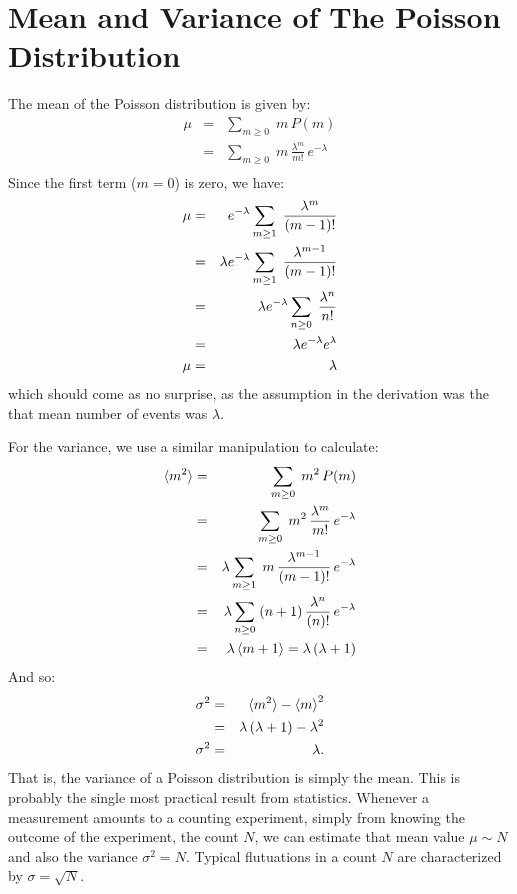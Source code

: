 \documentclass[12pt,oneside]{book}
\begin{document}
\section{Mean and Variance of The Poisson Distribution}
\label{sec:poissonmeanvar}

The mean of the Poisson distribution is given by:
\begin{eqnarray*}
\mu &=& \sum_{m \geq 0} \; m \, P(m) \\
&=& \sum_{m \geq 0} \; m \, \frac{\lambda^m}{m!} \, e^{-\lambda}\\
\end{eqnarray*}
Since the first term ($m=0$) is zero, we have:
\begin{eqnarray}
\mu &=& e^{-\lambda} \sum_{m \geq 1} \; \frac{\lambda^m}{(m-1)!} \notag \\
             &=& \lambda e^{-\lambda} \sum_{m \geq 1} \; \frac{\lambda^{m-1}}{(m-1)!} \notag \\
             &=& \lambda e^{-\lambda} \sum_{n \geq 0} \; \frac{\lambda^{n}}{n!} \notag \\
             &=& \lambda e^{-\lambda} e^\lambda \notag \\
\mu  &=& \lambda
\end{eqnarray}
which should come as no surprise, as the assumption in the derivation was the that mean number of events was $\lambda$. 

For the variance, we use a similar manipulation to calculate:
\begin{eqnarray*}
\braket{m^2} &=& \sum_{m \geq 0} \; m^2 \, P(m) \\
&=& \sum_{m \geq 0} \; m^2 \, \frac{\lambda^m}{m!} \, e^{-\lambda}\\
&=& \lambda \sum_{m \geq 1} \; m \, \frac{\lambda^{m-1}}{(m-1)!} \, e^{-\lambda}\\
&=& \lambda \sum_{n \geq 0} \; (n+1) \, \frac{\lambda^{n}}{(n)!} \, e^{-\lambda}\\
&=& \lambda \braket{m+1} = \lambda \, (\lambda+1)
\end{eqnarray*}
And so:
\begin{eqnarray}
\sigma^2 &=& \braket{m^2} - \braket{m}^2 \notag \\
&=& \lambda \, (\lambda+1) - \lambda^2 \notag \\
\sigma^2 &=& \lambda. 
\end{eqnarray}
That is, the variance of a Poisson distribution is simply the mean.
This is probably the single most practical result from statistics.
Whenever a measurement amounts to a counting experiment, simply from
knowing the outcome of the experiment, the count $N$, we can estimate
that mean value $\mu \sim N$ and also the variance $\sigma^2 = N$.
Typical flutuations in a count $N$ are characterized by $\sigma =
\sqrt{N}$.
\end{document}
